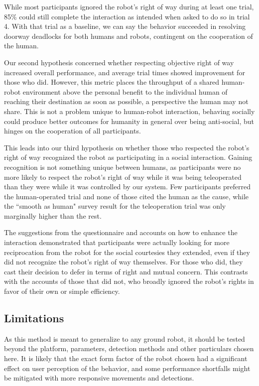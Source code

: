 \documentclass[letterpaper, 10 pt, conference]{ieeeconf}  %
\begin{document}
While most participants ignored the robot's right of way during at least one trial, 85\% could still complete the interaction as intended when asked to do so in trial 4. With that trial as a baseline, we can say the behavior succeeded in resolving doorway deadlocks for both humans and robots, contingent on the cooperation of the human.

Our second hypothesis concerned whether respecting objective right of way increased overall performance, and average trial times showed  improvement for those who did. However, this metric places the throughput of a shared human-robot environment above the personal benefit to the individual human of reaching their destination as soon as possible, a perspective the human may not share. This is not a problem unique to human-robot interaction, behaving socially could produce better outcomes for humanity in general over being anti-social, but hinges on the cooperation of all participants.

This leads into our third hypothesis on whether those who respected the robot's right of way recognized the robot as participating in a social interaction. Gaining recognition is not something unique between humans, as participants were no more likely to respect the robot's right of way while it was being teleoperated than they were while it was controlled by our system. Few participants preferred the human-operated trial and none of those cited the human as the cause, while the ``smooth as human" survey result for the teleoperation trial was only marginally higher than the rest.

The suggestions from the questionnaire and accounts on how to enhance the interaction demonstrated that participants were actually looking for more reciprocation from the robot for the social courtesies they extended, even if they did not recognize the robot's right of way themselves. For those who did, they cast their decision to defer in terms of right and mutual concern. This contrasts with the accounts of those that did not, who broadly ignored the robot's rights in favor of their own or simple efficiency.

\subsection{Limitations}
As this method is meant to generalize to any ground robot, it should be tested beyond the platform, parameters, detection methods and other particulars chosen here. It is likely that the exact form factor of the robot chosen had a significant effect on user perception of the behavior, and some performance shortfalls might be mitigated with more responsive movements and detections. 
\end{document}
